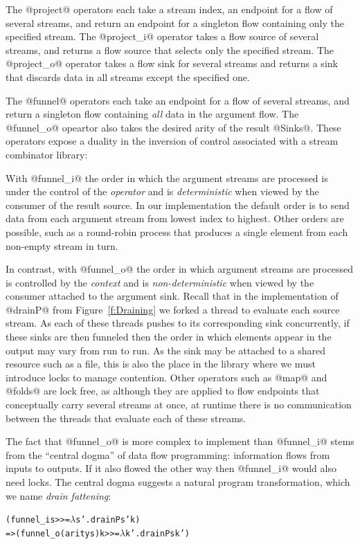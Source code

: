 The @project@ operators each take a stream index, an endpoint for a flow of several streams, and return an endpoint for a singleton flow containing only the specified stream. The @project_i@ operator takes a flow source of several streams, and returns a flow source that selects only the specified stream. The @project_o@ operator takes a flow sink for several streams and returns a sink that discards data in all streams except the specified one.

The @funnel@ operators each take an endpoint for a flow of several streams, and return a singleton flow containing \emph{all} data in the argument flow. The @funnel_o@ opeartor also takes the desired arity of the result @Sinks@. These operators expose a duality in the inversion of control associated with a stream combinator library:

With @funnel_i@ the order in which the argument streams are processed is under the control of the \emph{operator} and is \emph{deterministic} when viewed by the consumer of the result source. In our implementation the default order is to send data from each argument stream from lowest index to highest. Other orders are possible, such as a round-robin process that produces a single element from each non-empty stream in turn. 

In contrast, with @funnel_o@ the order in which argument streams are processed is controlled by the \emph{context} and is \emph{non-deterministic} when viewed by the consumer attached to the argument sink. Recall that in the implementation of @drainP@ from Figure~\ref{f:Draining} we forked a thread to evaluate each source stream. As each of these threads pushes to its corresponding sink concurrently, if these sinks are then funneled then the order in which elements appear in the output may vary from run to run. As the sink may be attached to a shared resource such as a file, this is also the place in the library where we must introduce locks to manage contention. Other operators such as @map@ and @folds@ are lock free, as although they are applied to flow endpoints that conceptually carry several streams at once, at runtime there is no communication between the threads that evaluate each of these streams.

The fact that @funnel_o@ is more complex to implement than @funnel_i@ stems from the ``central dogma'' of data flow programming: information flows from inputs to outputs. If it also flowed the other way then @funnel_i@ would also need locks. The central dogma suggests a natural program transformation, which we name \emph{drain fattening}:
\begin{alltt}
    (funnel_i           s >>= \(\lambda\)s'. drainP s' k)
 => (funnel_o (arity s) k >>= \(\lambda\)k'. drainP s  k')
\end{alltt}

